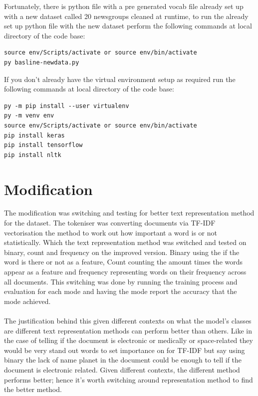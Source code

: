 \documentclass{article}
\begin{document}
\noindent
Fortunately, there is python file with a pre generated vocab file already set up with a new dataset called 20 newsgroups cleaned at runtime, to run the already set up python file with the new dataset perform the following commands at local directory of the code base:

\begin{lstlisting}
source env/Scripts/activate or source env/bin/activate
py basline-newdata.py
\end{lstlisting}

\noindent
If you don't already have the virtual environment setup as required run the following commands at local directory of the code base: 
\begin{lstlisting}
py -m pip install --user virtualenv
py -m venv env
source env/Scripts/activate or source env/bin/activate
pip install keras
pip install tensorflow
pip install nltk
\end{lstlisting}


\section{Modification}

The modification was switching and testing for better text representation method for the dataset. The tokeniser was converting documents via TF-IDF vectorisation the method to work out how important a word is or not statistically. Which the text representation method was switched and tested on binary, count and frequency on the improved version. Binary using the if the word is there or not as a feature, Count counting the amount times the words appear as a feature and frequency representing words on their frequency across all documents. This switching was done by running the training process and evaluation for each mode and having the mode report the accuracy that the mode achieved.\\
\\
The justification behind this given different contexts on what the model's classes are different text representation methods can perform better than others. Like in the case of telling if the document is electronic or medically or space-related they would be very stand out words to set importance on for TF-IDF but say using binary the lack of name planet in the document could be enough to tell if the document is electronic related. Given different contexts, the different method performs better; hence it’s worth switching around representation method to find the better method.
\end{document}
